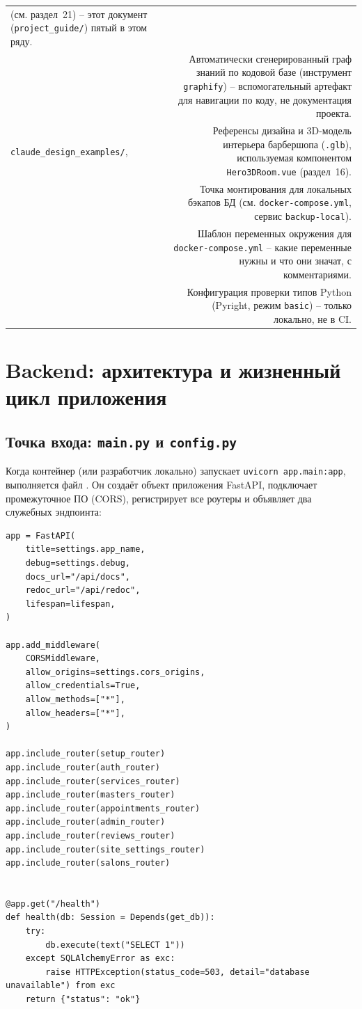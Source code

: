 \begin{xltabular}{\textwidth}{M D}
  (см. раздел~21) -- этот документ (\texttt{project_guide/}) пятый в
  этом ряду. \\
 & Автоматически сгенерированный граф знаний по
  кодовой базе (инструмент \texttt{graphify}) -- вспомогательный
  артефакт для навигации по коду, не документация проекта. \\
\texttt{claude_design_examples/},  & Референсы
  дизайна и 3D-модель интерьера барбершопа (\texttt{.glb}), используемая
  компонентом \texttt{Hero3DRoom.vue} (раздел~16). \\
 & Точка монтирования для локальных бэкапов БД
  (см. \texttt{docker-compose.yml}, сервис \texttt{backup-local}). \\
 & Шаблон переменных окружения для
  \texttt{docker-compose.yml} -- какие переменные нужны и что они
  значат, с комментариями. \\
 & Конфигурация проверки типов Python
  (Pyright, режим \texttt{basic}) -- только локально, не в CI. \\
\end{xltabular}

\section{Backend: архитектура и жизненный цикл приложения}

\subsection{Точка входа: \texttt{main.py} и \texttt{config.py}}

Когда контейнер (или разработчик локально) запускает
\texttt{uvicorn app.main:app}, выполняется файл
. Он создаёт объект приложения FastAPI,
подключает промежуточное ПО (CORS), регистрирует все роутеры и объявляет
два служебных эндпоинта:

\begin{verbatim}
app = FastAPI(
    title=settings.app_name,
    debug=settings.debug,
    docs_url="/api/docs",
    redoc_url="/api/redoc",
    lifespan=lifespan,
)

app.add_middleware(
    CORSMiddleware,
    allow_origins=settings.cors_origins,
    allow_credentials=True,
    allow_methods=["*"],
    allow_headers=["*"],
)

app.include_router(setup_router)
app.include_router(auth_router)
app.include_router(services_router)
app.include_router(masters_router)
app.include_router(appointments_router)
app.include_router(admin_router)
app.include_router(reviews_router)
app.include_router(site_settings_router)
app.include_router(salons_router)


@app.get("/health")
def health(db: Session = Depends(get_db)):
    try:
        db.execute(text("SELECT 1"))
    except SQLAlchemyError as exc:
        raise HTTPException(status_code=503, detail="database unavailable") from exc
    return {"status": "ok"}
\end{verbatim}

